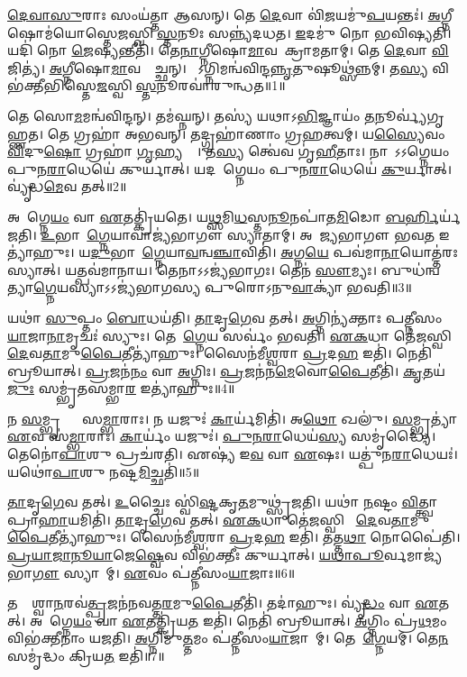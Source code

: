 \ul{𑌦𑍇}\ul{𑌵𑌾}\ul{𑌸𑍁}𑌰𑌾𑌃 𑌸𑌂𑌯॑𑌤𑍍𑌤𑌾 𑌆𑌸𑌨𑍍।
𑌤𑍇 \ul{𑌦𑍇}𑌵𑌾 𑌵𑌿॑\ul{𑌜}𑌯𑌮𑍁॑\ul{𑌪}𑌯𑌨𑍍𑌤𑌃॑।
\ul{𑌅}𑌗𑍍𑌨𑍀𑌷𑍋𑌮॑𑌯𑍋𑌸𑍍𑌤𑍇\ul{𑌜}𑌸𑍍𑌵𑌿𑌨𑍀᳚\ul{𑌸𑍍𑌤}𑌨𑍂𑌃 𑌸𑌨𑍍𑌨𑍍𑌯॑𑌦𑌧𑌤।
\ul{𑌇}𑌦𑌮𑍁॑ 𑌨𑍋 𑌭𑌵𑌿𑌷𑍍𑌯𑌤𑌿।
𑌯𑌦𑌿॑ 𑌨𑍋 \ul{𑌜𑍇}𑌷𑍍𑌯𑌨𑍍𑌤𑍀𑌤𑌿॑।
𑌤𑍇\ul{𑌨𑌾}𑌗𑍍𑌨𑍀𑌷𑍋\ul{𑌮𑌾}𑌵𑌪𑌾᳚𑌕𑍍𑌰𑌾𑌮𑌤𑌾𑌮𑍍।
𑌤𑍇 \ul{𑌦𑍇}𑌵𑌾 \ul{𑌵𑌿}𑌜𑌿𑌤𑍍𑌯॑।
\ul{𑌅}𑌗𑍍𑌨𑍀𑌷𑍋\ul{𑌮𑌾}𑌵𑌨𑍍𑌵𑍈᳚𑌚𑍍𑌛𑌨𑍍।
𑌤𑍇᳚𑌽𑌗𑍍𑌨𑌿𑌮𑌨𑍍𑌵॑\-𑌵𑌿𑌨𑍍𑌦\ul{𑌨𑍍𑌨𑍃}𑌤𑍁𑌷𑍂𑌥𑍍𑌸॑𑌨𑍍𑌨𑌮𑍍।
𑌤\ul{𑌸𑍍𑌯} 𑌵𑌿𑌭॑𑌕𑍍𑌤𑍀𑌭𑌿𑌸𑍍𑌤𑍇\ul{𑌜}𑌸𑍍𑌵𑌿𑌨𑍀᳚\ul{𑌸𑍍𑌤}𑌨𑍂\-𑌰𑌵𑌾॑𑌰𑍁𑌨𑍍𑌧𑌤॥1॥

𑌤𑍇 𑌸𑍋\ul{𑌮}𑌮𑌨𑍍𑌵॑𑌵𑌿𑌨𑍍𑌦𑌨𑍍।
𑌤𑌮॑𑌘𑍍𑌨𑌨𑍍।
𑌤𑌸𑍍𑌯॑ 𑌯𑌥𑌾\-𑌽\ul{𑌭𑌿}𑌜𑍍𑌞𑌾𑌯𑌂॑ \ul{𑌤}𑌨𑍂𑌰𑍍𑌵𑍍𑌯॑𑌗𑍃𑌹𑍍𑌣𑌤।
𑌤𑍇 𑌗𑍍𑌰𑌹𑌾॑ 𑌅𑌭𑌵𑌨𑍍।
𑌤𑌦𑍍𑌗𑍍𑌰𑌹𑌾॑𑌣𑌾𑌂 𑌗𑍍𑌰\ul{𑌹}𑌤𑍍𑌵𑌮𑍍।
𑌯\ul{𑌸𑍍𑌯𑍈}𑌵𑌂 \ul{𑌵𑌿}𑌦𑍁\ul{𑌷𑍋} 𑌗𑍍𑌰𑌹𑌾॑ \ul{𑌗𑍃}𑌹𑍍𑌯𑌨𑍍𑌤𑍇᳚।
𑌤\ul{𑌸𑍍𑌯} 𑌤𑍍𑌵𑍇॑𑌵 𑌗𑍃॑\ul{𑌹𑍀}𑌤𑌾𑌃।
𑌨𑌾𑌨𑌾᳚\-𑌽𑌽𑌗𑍍𑌨𑍇𑌯𑌂 𑌪𑍁𑌨\ul{𑌰𑌾}𑌧𑍇𑌯𑍇॑ 𑌕𑍁𑌰𑍍𑌯𑌾𑌤𑍍।
𑌯𑌦𑌨𑌾᳚𑌗𑍍𑌨𑍇𑌯𑌂 𑌪𑍁𑌨\ul{𑌰𑌾}𑌧𑍇𑌯𑍇॑ \ul{𑌕𑍁}𑌰𑍍𑌯𑌾𑌤𑍍।
𑌵𑍍𑌯𑍃॑𑌦𑍍𑌧\ul{𑌮𑍇}𑌵 𑌤𑌤𑍍॥2॥

𑌅𑌨𑌾᳚𑌗𑍍𑌨𑍇\ul{𑌯𑌂} 𑌵𑌾 \ul{𑌏}𑌤𑌤𑍍𑌕𑍍𑌰𑌿॑𑌯𑌤𑍇।
𑌯\ul{𑌥𑍍𑌸}𑌮𑌿\ul{𑌧}𑌸𑍍𑌤\ul{𑌨𑍂}𑌨𑌪𑌾॑𑌤\ul{𑌮𑌿}𑌡𑍋 \ul{𑌬}\ul{𑌰𑍍}\mbox{}𑌹𑌿𑌰𑍍𑌯॑𑌜𑌤𑌿।
\ul{𑌉}𑌭𑌾𑌵𑌾᳚\ul{𑌗𑍍𑌨𑍇}𑌯𑌾𑌵𑌾𑌜𑍍𑌯॑𑌭𑌾𑌗𑍗 𑌸𑍍𑌯𑌾𑌤𑌾𑌮𑍍।
𑌅𑌨𑌾᳚𑌜𑍍𑌯𑌭𑌾𑌗𑍗 𑌭𑌵\ul{𑌤} 𑌇𑌤𑍍𑌯𑌾॑𑌹𑍁𑌃।
𑌯\ul{𑌦𑍁}𑌭𑌾𑌵𑌾᳚\ul{𑌗𑍍𑌨𑍇}𑌯𑌾\ul{𑌵}𑌨𑍍𑌵\ul{𑌞𑍍𑌚𑌾}𑌵𑌿𑌤𑌿॑।
\ul{𑌅}𑌗𑍍𑌨\ul{𑌯𑍇} 𑌪𑌵॑𑌮𑌾\ul{𑌨𑌾}𑌯𑍋𑌤𑍍𑌤॑𑌰𑌃 𑌸𑍍𑌯𑌾𑌤𑍍।
𑌯𑌤𑍍𑌪𑌵॑𑌮𑌾𑌨𑌾𑌯।
𑌤𑍇𑌨𑌾𑌽𑌽𑌜𑍍𑌯॑𑌭𑌾𑌗𑌃।
𑌤𑍇𑌨॑ \ul{𑌸𑍗}𑌮𑍍𑌯𑌃।
𑌬𑍁𑌧॑𑌨𑍍𑌵𑌤𑍍𑌯𑌾\ul{𑌗𑍍𑌨𑍇}𑌯𑌸𑍍𑌯𑌾𑌽𑌽𑌜𑍍𑌯॑𑌭𑌾𑌗𑌸𑍍𑌯 𑌪𑍁𑌰𑍋\-𑌽𑌨𑍁\ul{𑌵𑌾}𑌕𑍍𑌯𑌾॑ 𑌭𑌵𑌤𑌿॥3॥

𑌯𑌥𑌾॑ \ul{𑌸𑍁}𑌪𑍍𑌤𑌂 \ul{𑌬𑍋}𑌧𑌯॑𑌤𑌿।
\ul{𑌤𑌾}𑌦𑍃\ul{𑌗𑍇}𑌵 𑌤𑌤𑍍।
\ul{𑌅}𑌗𑍍𑌨𑌿𑌨𑍍𑌯॑𑌕𑍍𑌤𑌾𑌃 𑌪𑌤𑍍𑌨𑍀𑌸𑌂\ul{𑌯𑌾}𑌜𑌾\ul{𑌨𑌾}𑌮𑍃𑌚𑌃॑ 𑌸𑍍𑌯𑍁𑌃।
𑌤𑍇𑌨𑌾᳚\ul{𑌗𑍍𑌨𑍇}𑌯 𑌸𑌰𑍍𑌵𑌂॑ 𑌭𑌵𑌤𑌿।
\ul{𑌏}\ul{𑌕}𑌧𑌾 𑌤𑍇॑\ul{𑌜}𑌸𑍍𑌵𑌿𑌨𑍀𑌂᳚ \ul{𑌦𑍇}𑌵\ul{𑌤𑌾}𑌮𑍁\ul{𑌪𑍈}𑌤𑍀𑌤𑍍𑌯𑌾॑𑌹𑍁𑌃।
𑌸𑍈𑌨॑𑌮𑍀\ul{𑌶𑍍𑌵}𑌰𑌾 \ul{𑌪𑍍𑌰}𑌦\ul{𑌹} 𑌇𑌤𑌿॑।
𑌨𑍇𑌤𑌿॑ 𑌬𑍍𑌰𑍂𑌯𑌾𑌤𑍍।
\ul{𑌪𑍍𑌰}𑌜𑌨॑\ul{𑌨𑌂} 𑌵𑌾 \ul{𑌅}𑌗𑍍𑌨𑌿𑌃।
\ul{𑌪𑍍𑌰}𑌜𑌨॑𑌨\ul{𑌮𑍇}𑌵𑍋\ul{𑌪𑍈}𑌤𑍀𑌤𑌿॑।
\ul{𑌕𑍃}𑌤𑌯॑\ul{𑌜𑍁𑌃} 𑌸𑌮𑍍𑌭𑍃॑𑌤𑌸𑌮𑍍𑌭𑌾\ul{𑌰} 𑌇𑌤𑍍𑌯𑌾॑𑌹𑍁𑌃॥4॥

𑌨 \ul{𑌸}𑌮𑍍𑌭𑍃𑌤𑍍𑌯𑌾𑌃᳚ 𑌸\ul{𑌮𑍍𑌭𑌾}𑌰𑌾𑌃।
𑌨 𑌯𑌜𑍁𑌃॑ \ul{𑌕𑌾}𑌰𑍍𑌯॑𑌮𑌿𑌤𑌿॑।
𑌅\ul{𑌥𑍋} 𑌖𑌲𑍁॑।
\ul{𑌸}𑌮𑍍𑌭𑍃𑌤𑍍𑌯𑌾॑ \ul{𑌏}𑌵 𑌸॑\ul{𑌮𑍍𑌭𑌾}𑌰𑌾𑌃।
\ul{𑌕𑌾}𑌰𑍍𑌯𑌂॑ 𑌯𑌜𑍁𑌃॑।
\ul{𑌪𑍁}\ul{𑌨}\ul{𑌰𑌾}𑌧𑍇𑌯॑\ul{𑌸𑍍𑌯} 𑌸𑌮𑍃॑𑌦𑍍𑌧𑍍𑌯𑍈।
𑌤𑍇𑌨𑍋॑\ul{𑌪𑌾}\ul{}𑌶𑍁 𑌪𑍍𑌰𑌚॑𑌰𑌤𑌿।
𑌏𑌷𑍍𑌯॑ 𑌇\ul{𑌵} 𑌵𑌾 \ul{𑌏}𑌷𑌃।
𑌯𑌤𑍍𑌪𑍁॑𑌨\ul{𑌰𑌾}𑌧𑍇𑌯𑌃॑।
𑌯𑌥𑍋॑\ul{𑌪𑌾}\ul{}𑌶𑍁 \ul{𑌨}𑌷𑍍𑌟\ul{𑌮𑌿}𑌚𑍍𑌛𑌤𑌿॑॥5॥

\ul{𑌤𑌾}𑌦𑍃\ul{𑌗𑍇}𑌵 𑌤𑌤𑍍।
\ul{𑌉}𑌚𑍍𑌚𑍈𑌃 𑌸𑍍𑌵𑌿॑\ul{𑌷𑍍𑌟}𑌕𑍃\ul{𑌤}𑌮𑍁𑌥𑍍𑌸𑍃॑𑌜𑌤𑌿।
𑌯𑌥𑌾॑ \ul{𑌨}𑌷𑍍𑌟𑌂 \ul{𑌵𑌿}𑌤𑍍𑌤𑍍𑌵𑌾 𑌪𑍍𑌰𑌾\ul{𑌹𑌾}𑌯𑌮𑌿𑌤𑌿॑।
\ul{𑌤𑌾}𑌦𑍃\ul{𑌗𑍇}𑌵 𑌤𑌤𑍍।
\ul{𑌏}\ul{𑌕}𑌧𑌾 𑌤𑍇॑\ul{𑌜}𑌸𑍍𑌵𑌿𑌨𑍀𑌂᳚ \ul{𑌦𑍇}𑌵\ul{𑌤𑌾}𑌮𑍁\ul{𑌪𑍈}𑌤𑍀𑌤𑍍𑌯𑌾॑𑌹𑍁𑌃।
𑌸𑍈𑌨॑𑌮𑍀\ul{𑌶𑍍𑌵}𑌰𑌾 \ul{𑌪𑍍𑌰}𑌦\ul{𑌹} 𑌇𑌤𑌿॑।
𑌤𑌤𑍍𑌤\ul{𑌥𑌾} 𑌨𑍋𑌪𑍈॑𑌤𑌿।
\ul{𑌪𑍍𑌰}\ul{𑌯𑌾}\ul{𑌜𑌾}\ul{𑌨𑍂}\ul{𑌯𑌾}𑌜𑍇\ul{𑌷𑍍𑌵𑍇}𑌵 𑌵𑌿𑌭॑𑌕𑍍𑌤𑍀𑌃 𑌕𑍁𑌰𑍍𑌯𑌾𑌤𑍍।
\ul{𑌯}\ul{𑌥𑌾}\ul{𑌪𑍂}𑌰𑍍𑌵𑌮𑌾𑌜𑍍𑌯॑𑌭𑌾\ul{𑌗𑍗} 𑌸𑍍𑌯𑌾𑌤𑌾᳚𑌮𑍍।
\ul{𑌏}𑌵𑌂 𑌪॑𑌤𑍍𑌨𑍀𑌸𑌂\ul{𑌯𑌾}𑌜𑌾𑌃॥6॥

𑌤𑌦𑍍𑌵𑍈᳚𑌶𑍍𑌵𑌾\ul{𑌨}𑌰𑌵॑\ul{𑌤𑍍𑌪𑍍𑌰}𑌜𑌨॑𑌨𑌵𑌤𑍍𑌤\ul{𑌰}𑌮𑍁\ul{𑌪𑍈}𑌤𑍀𑌤𑌿॑।
𑌤𑌦𑌾॑𑌹𑍁𑌃।
𑌵𑍍𑌯𑍃॑\ul{𑌦𑍍𑌧𑌂} 𑌵𑌾 \ul{𑌏}𑌤𑌤𑍍।
𑌅𑌨𑌾᳚𑌗𑍍𑌨𑍇\ul{𑌯𑌂} 𑌵𑌾 \ul{𑌏}𑌤𑌤𑍍𑌕𑍍𑌰𑌿॑𑌯\ul{𑌤} 𑌇𑌤𑌿॑।
𑌨𑍇𑌤𑌿॑ 𑌬𑍍𑌰𑍂𑌯𑌾𑌤𑍍।
\ul{𑌅}𑌗𑍍𑌨𑌿𑌂 𑌪𑍍𑌰॑\ul{𑌥}𑌮𑌂 𑌵𑌿𑌭॑𑌕𑍍𑌤𑍀𑌨𑌾𑌂 𑌯𑌜𑌤𑌿।
\ul{𑌅}𑌗𑍍𑌨𑌿𑌮𑍁॑\ul{𑌤𑍍𑌤}𑌮𑌂 𑌪॑𑌤𑍍𑌨𑍀𑌸𑌂\ul{𑌯𑌾}𑌜𑌾𑌨𑌾᳚𑌮𑍍।
𑌤𑍇𑌨𑌾᳚\ul{𑌗𑍍𑌨𑍇}𑌯𑌮𑍍।
𑌤𑍇\ul{𑌨} 𑌸𑌮𑍃॑𑌦𑍍𑌧𑌂 𑌕𑍍𑌰𑌿𑌯\ul{𑌤} 𑌇𑌤𑌿॑॥7॥\anuvakamend[\ul{𑌅}\ul{𑌰𑍁}\ul{𑌨𑍍𑌧}\ul{𑌤𑍈}𑌵 𑌤𑌦𑍍𑌭॑𑌵\ul{𑌤𑌿} 𑌸𑌮𑍍𑌭𑍃॑𑌤𑌸𑌮𑍍𑌭𑌾\ul{𑌰} 𑌇𑌤𑍍𑌯𑌾॑𑌹𑍁\ul{𑌰𑌿}𑌚𑍍𑌛𑌤𑌿॑ 𑌪𑌤𑍍𑌨𑍀𑌸𑌂\ul{𑌯𑌾}𑌜𑌾 𑌨𑌵॑ 𑌚]

